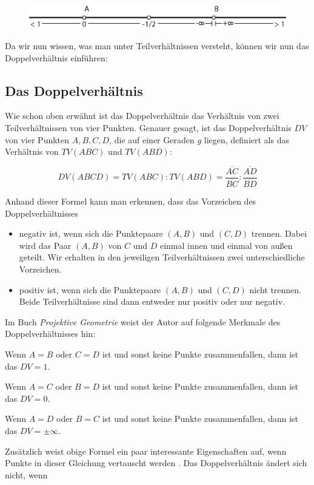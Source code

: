 \documentclass[12pt,a4paper]{article}
\begin{document}
\begin{figure}[htbp]
\centering
\includegraphics[width=\textwidth]{Bilder/tv_strahl.png}
\end{figure}

Da wir nun wissen, was man unter Teilverhältnissen versteht, können wir nun das Doppelverhältnis einführen:

\subsection{Das Doppelverhältnis}

Wie schon oben erwähnt ist das Doppelverhältnis das Verhältnis von zwei Teilverhältnissen von vier Punkten. Genauer gesagt, ist das Doppelverhältnis $DV$ von vier Punkten $A, B, C, D$, die auf einer Geraden $g$ liegen, definiert als das Verhältnis von $TV(A B C)$ und $TV(A B D)$:

\[DV(A B C D) = TV(A B C) : TV(A B D) = \dfrac{\overline{A C}}{\overline{B C}} : \dfrac{\overline{A D}}{\overline{B D}}\]

Anhand dieser Formel kann man erkennen, dass das Vorzeichen des Doppelverhältnisses
\begin{itemize}
\item negativ ist, wenn sich die Punktepaare $(A, B)$ und $(C, D)$ trennen. Dabei wird das Paar $(A, B)$ von $C$ und $D$ einmal innen und einmal von außen geteilt. Wir erhalten in den jeweiligen Teilverhältnissen zwei unterschiedliche Vorzeichen.
\item positiv ist, wenn sich die Punktepaare $(A, B)$ und $(C, D)$ nicht trennen. Beide Teilverhältnisse sind dann entweder nur positiv oder nur negativ.
\end{itemize}

Im Buch \textit{Projektive Geometrie} weist der Autor auf folgende Merkmale des Doppelverhältnisses hin:

Wenn $A = B$ oder $C = D$ ist und sonst keine Punkte zusammenfallen, dann ist das $DV = 1$.

Wenn $A = C$ oder $B = D$ ist und sonst keine Punkte zusammenfallen, dann ist das $DV = 0$.

Wenn $A = D$ oder $B = C$ ist und sonst keine Punkte zusammenfallen, dann ist das $DV = \pm\infty$.

Zusätzlich weist obige Formel ein paar interessante Eigenschaften auf, wenn Punkte in dieser Gleichung vertauscht werden \citep[vgl.][S.~77]{projektiveGeometrie}. Das Doppelverhältnis ändert sich nicht, wenn
\end{document}
